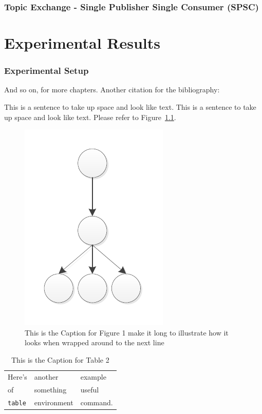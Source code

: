 \documentclass{thesis}
\begin{document}
\subsection{Topic Exchange - Single Publisher Single Consumer (SPSC)}


\chapter{Experimental Results}
\subsection{Experimental Setup}
And so on, for more chapters.
Another citation for the bibliography:\cite{anotherbook}

   This is a sentence to take up space and look like text.
   This is a sentence to take up space and look like text.
   Please refer to Figure~\ref{Figure 1}.  %

 
\begin{figure}
\centering
\vspace{2.0in} 
\includegraphics{Drawing4}  
\caption{This is the Caption for Figure 1 make it long to illustrate
   how it looks when wrapped around to the next line}
\label{Figure 1}  %
\end{figure}


\begin{table}
\caption{This is the Caption for Table 2}
\label{mytable}
\begin{center}
\begin{tabular}{lll}
Here's	& another 	& example \\
of		& something	& useful \\
\verb+table+ & environment & command. \end{tabular}
\end{center}
\end{table}
\end{document}
